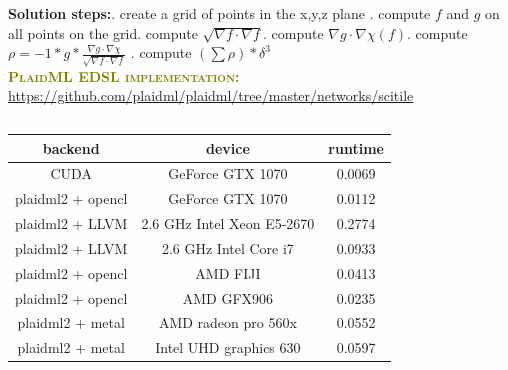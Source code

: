 \documentclass[9pt,twocolumn,twoside,notitlepage]{article}
\begin{document}
 \textbf{Solution steps:}. create a grid of points in the x,y,z plane . compute $f$ and $g$ on all points on the grid. compute $\sqrt{\nabla f \cdot \nabla f}$. compute $\nabla g \cdot \nabla \chi (f)$. compute $\rho = -1 * g * \frac{\nabla g \cdot \nabla 
 \chi}{\sqrt{\nabla f \cdot \nabla f}}$ . compute $(\sum \rho)*\delta^3$\newline
 \\[4in]
 {\normalfont\sffamily\bfseries\scshape\fontsize{12}{14}\selectfont \textcolor{olive} {PlaidML EDSL implementation:}}\newline
 \hyperlink{https://github.com/plaidml/plaidml/tree/master/networks/scitile}{https://github.com/plaidml/plaidml/tree/master/networks/scitile}
\inputminted{python}{networks/scitile/uw_toroidal_shell/docs/partial_diff.py}
 \begin{table}[htbp]
 \centering
 \begin{tabular}{ccc}
 \hline
 backend & device & runtime \\
 \hline
 CUDA  & GeForce GTX 1070  & 0.0069 \\
 plaidml2 + opencl & GeForce GTX 1070 & 0.0112 \\
 plaidml2 + LLVM  & 2.6 GHz Intel Xeon E5-2670 & 0.2774 \\
 plaidml2 + LLVM  &  2.6 GHz Intel Core i7 & 0.0933\\
 plaidml2 + opencl & AMD FIJI & 0.0413 \\
 plaidml2 + opencl & AMD GFX906 & 0.0235\\
 plaidml2 + metal & AMD radeon pro 560x & 0.0552 \\
 plaidml2 + metal &  Intel UHD graphics 630 & 0.0597 \\
 \hline
 \end{tabular}
   \label{tab:shapefunctions}
 \end{table}

 
\end{document}
